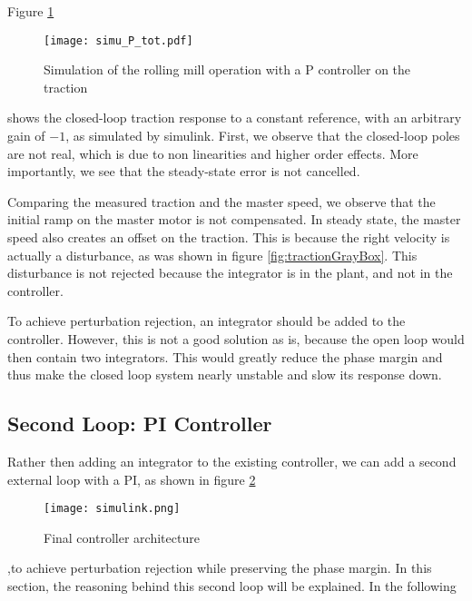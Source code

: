 Figure \ref{fig:simuPTot}
\begin{figure}[htbp]
  \centering
  \texttt{[image: simu\_P\_tot.pdf]}
  \caption{Simulation of the rolling mill operation with a P controller on the traction\label{fig:simuPTot}}
\end{figure}
shows the closed-loop traction response to a constant reference, with an arbitrary gain of $-1$, as simulated by simulink. First, we observe that the closed-loop poles are not real, which is due to non linearities and higher order effects. More importantly, we see that the steady-state error is not cancelled.

Comparing the measured traction and the master speed, we observe that the initial ramp on the master motor is not compensated. In steady state, the master speed also creates an offset on the traction. This is because the right velocity is actually a disturbance, as was shown in figure \ref{fig:tractionGrayBox}. This disturbance is not rejected because the integrator is in the plant, and not in the controller.

To achieve perturbation rejection, an integrator should be added to the controller. However, this is not a good solution as is, because the open loop would then contain two integrators. This would greatly reduce the phase margin and thus make the closed loop system nearly unstable and slow its response down.

\subsection{Second Loop: PI Controller}
Rather then adding an integrator to the existing controller, we can add a second external loop with a PI, as shown in figure \ref{fig:simulinkTot}
\begin{figure}[htbp]
  \centering
  \texttt{[image: simulink.png]}
  \caption{Final controller architecture\label{fig:simulinkTot}}
\end{figure}
,to achieve perturbation rejection while preserving the phase margin. In this section, the reasoning behind this second loop will be explained. In the following
